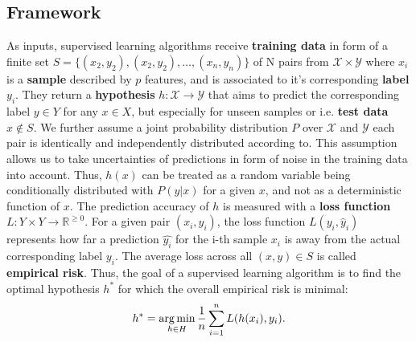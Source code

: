 \subsection{Framework}
As inputs, supervised learning algorithms receive \textbf{training data} in form of a finite set $ S = \{({x}_{2}, y_2), ({x}_{2}, y_2), \dots, ({x}_{n}, y_n)\}$ of N pairs from $ \mathcal{X} \times \mathcal{Y} $ where $ x_i $ is a \textbf{sample} described by $ p $ features, and is associated to it's corresponding \textbf{label} $ y_i $.
They return a \textbf{hypothesis} $ h: \mathcal{X} \to \mathcal{Y} $ that aims to predict the corresponding label $ y \in Y $ for any $ x \in X $, but especially for unseen samples or i.e. \textbf{test data} $ x \notin S $.
We further assume a joint probability distribution $ P $ over $ \mathcal{X} $ and $ \mathcal{Y} $ each pair is identically and independently distributed according to. 
This assumption allows us to take uncertainties of predictions in form of noise in the training data into account. 
Thus, $ h(x) $ can be treated as a random variable being conditionally distributed with $ P(y | x) $ for a given $ x $, and not as a deterministic function of $ x $.
The prediction accuracy of $ h $ is measured with a  \textbf{loss function} $ L : Y \times Y \to \mathbb{R}^{\geq 0}$.
For a given pair $ ({x}_i, y_i) $, the loss function $ L(y_i, \hat{y}_i) $ represents how far a prediction $ \hat{y_i} $ for the i-th sample $ x_i $ is away from the actual corresponding label $ y_i $. 
The average loss across all $ (x,y) \in S $ is called \textbf{empirical risk}.
Thus, the goal of a supervised learning algorithm is to find the optimal hypothesis $ h^* $ for which the overall empirical risk is minimal: 
\begin{equation}
	h^* = \operatorname*{arg\,min}_{h \in H} \dfrac{1}{n} \sum_{i=1}^{n} L(h(x_i), y_i).
\end{equation}

